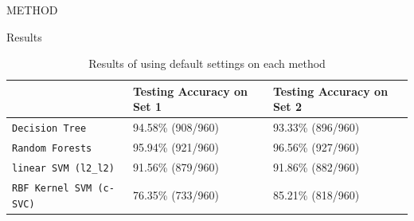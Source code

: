 \documentclass[final,hyperref={pdfpagelabels=false}]{beamer}
\begin{document}
\begin{frame}[t]
\begin{columns}[t]
\begin{column}{.465\textwidth}
\begin{block}{METHOD}


     
\end{block}


\begin{block}{Results}



\begin{table}[h]
\centering
\caption{Results of using default settings on each method}
\label{result1}
\begin{tabular}{l|l|l}
                    & Testing Accuracy on Set 1     & Testing Accuracy on Set 2     \\ \hline
\texttt{Decision Tree}       & 94.58\% (908/960) & 93.33\% (896/960) \\ \hline
\texttt{Random Forests}      & 95.94\% (921/960) & 96.56\% (927/960) \\ \hline
\texttt{linear SVM (l2\_l2)} & 91.56\% (879/960) & 91.86\% (882/960) \\ \hline
\texttt{RBF Kernel SVM (c-SVC)}      & 76.35\% (733/960) & 85.21\% (818/960)        
\end{tabular}
\end{table}


\end{block}
\end{column}
\end{columns}
\end{frame}
\end{document}
